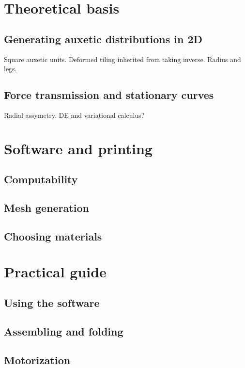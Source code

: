 \documentclass{article}
\begin{document}
\section{Theoretical basis}

\subsection{Generating auxetic distributions in 2D}
Square auxetic units. Deformed tiling inherited from taking inverse. Radius and legs.

\subsection{Force transmission and stationary curves}
Radial assymetry. DE and variational calculus?

\section{Software and printing}

\subsection{Computability}

\subsection{Mesh generation}

\subsection{Choosing materials}

\section{Practical guide}

\subsection{Using the software}

\subsection{Assembling and folding}

\subsection{Motorization}
\end{document}
